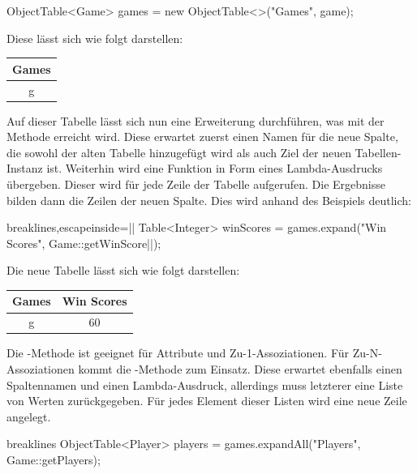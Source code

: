 \begin{jcodeblock}
    ObjectTable<Game> games = new ObjectTable<>("Games", game);
\end{jcodeblock}

Diese lässt sich wie folgt darstellen:

\begin{tabular}{|c|}
    \hline
    \textbf{Games} \\
    \hline
    g \\
    \hline
\end{tabular}

Auf dieser Tabelle lässt sich nun eine Erweiterung durchführen, was mit der Methode  erreicht wird.
Diese erwartet zuerst einen Namen für die neue Spalte, die sowohl der alten Tabelle hinzugefügt wird als auch Ziel der neuen Tabellen-Instanz ist.
Weiterhin wird eine Funktion in Form eines Lambda-Ausdrucks übergeben.
Dieser wird für jede Zeile der Tabelle aufgerufen.
Die Ergebnisse bilden dann die Zeilen der neuen Spalte.
Dies wird anhand des Beispiels deutlich:

\begin{jcodeblock*}{breaklines,escapeinside=||}
    Table<Integer> winScores = games.expand("Win Scores", Game::getWinScore|\footnotemark|);
\end{jcodeblock*}

Die neue Tabelle lässt sich wie folgt darstellen:

\begin{tabular}{|c|c|}
    \hline
    \textbf{Games} & \textbf{Win Scores} \\
    \hline
    g & 60 \\
    \hline
\end{tabular}

Die -Methode ist geeignet für Attribute und Zu-1-Assoziationen.
Für Zu-N-Assoziationen kommt die -Methode zum Einsatz.
Diese erwartet ebenfalls einen Spaltennamen und einen Lambda-Ausdruck,
allerdings muss letzterer eine Liste von Werten zurückgegeben.
Für jedes Element dieser Listen wird eine neue Zeile angelegt.

\begin{jcodeblock*}{breaklines}
    ObjectTable<Player> players = games.expandAll("Players", Game::getPlayers);
\end{jcodeblock*}

